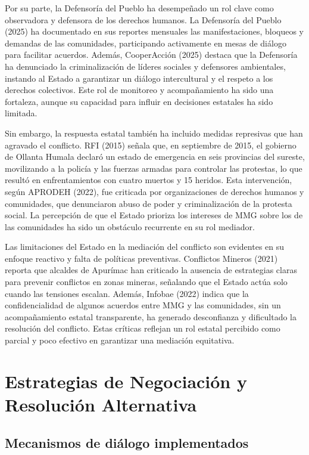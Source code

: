 \documentclass[
  stu,
  floatsintext,
  longtable,
  a4paper,
  nolmodern,
  notxfonts,
  notimes,
  colorlinks=true,linkcolor=blue,citecolor=blue,urlcolor=blue]{apa7}
\begin{document}
Por su parte, la Defensoría del Pueblo ha desempeñado un rol clave como
observadora y defensora de los derechos humanos. La Defensoría del
Pueblo (2025) ha documentado en sus reportes mensuales las
manifestaciones, bloqueos y demandas de las comunidades, participando
activamente en mesas de diálogo para facilitar acuerdos. Además,
CooperAcción (2025) destaca que la Defensoría ha denunciado la
criminalización de líderes sociales y defensores ambientales, instando
al Estado a garantizar un diálogo intercultural y el respeto a los
derechos colectivos. Este rol de monitoreo y acompañamiento ha sido una
fortaleza, aunque su capacidad para influir en decisiones estatales ha
sido limitada.

Sin embargo, la respuesta estatal también ha incluido medidas represivas
que han agravado el conflicto. RFI (2015) señala que, en septiembre de
2015, el gobierno de Ollanta Humala declaró un estado de emergencia en
seis provincias del sureste, movilizando a la policía y las fuerzas
armadas para controlar las protestas, lo que resultó en enfrentamientos
con cuatro muertos y 15 heridos. Esta intervención, según APRODEH
(2022), fue criticada por organizaciones de derechos humanos y
comunidades, que denunciaron abuso de poder y criminalización de la
protesta social. La percepción de que el Estado prioriza los intereses
de MMG sobre los de las comunidades ha sido un obstáculo recurrente en
su rol mediador.

Las limitaciones del Estado en la mediación del conflicto son evidentes
en su enfoque reactivo y falta de políticas preventivas. Conflictos
Mineros (2021) reporta que alcaldes de Apurímac han criticado la
ausencia de estrategias claras para prevenir conflictos en zonas
mineras, señalando que el Estado actúa solo cuando las tensiones
escalan. Además, Infobae (2022) indica que la confidencialidad de
algunos acuerdos entre MMG y las comunidades, sin un acompañamiento
estatal transparente, ha generado desconfianza y dificultado la
resolución del conflicto. Estas críticas reflejan un rol estatal
percibido como parcial y poco efectivo en garantizar una mediación
equitativa.

\section{Estrategias de Negociación y Resolución
Alternativa}\label{estrategias-de-negociaciuxf3n-y-resoluciuxf3n-alternativa}

\subsection{Mecanismos de diálogo
implementados}\label{mecanismos-de-diuxe1logo-implementados}
\end{document}
